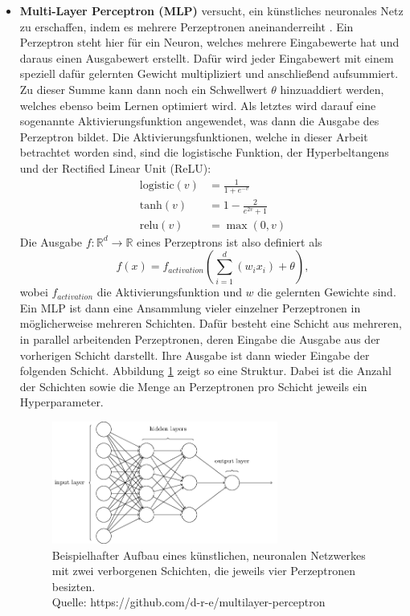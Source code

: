 \begin{itemize}
   \item \textbf{Multi-Layer Perceptron (MLP)} versucht, ein künstliches neuronales Netz zu erschaffen, indem es
    mehrere Perzeptronen aneinanderreiht \cite{mlMLP}. Ein Perzeptron steht hier für ein Neuron, welches mehrere
    Eingabewerte hat und daraus einen Ausgabewert erstellt. Dafür wird jeder Eingabewert mit einem speziell dafür
    gelernten Gewicht multipliziert und anschließend aufsummiert. Zu dieser Summe kann dann noch ein Schwellwert
    $\theta$ hinzuaddiert werden, welches ebenso beim Lernen optimiert wird. Als letztes wird darauf eine sogenannte
    Aktivierungsfunktion angewendet, was dann die Ausgabe des Perzeptron bildet. Die Aktivierungsfunktionen,
    welche in dieser Arbeit betrachtet worden sind, sind die logistische Funktion, der Hyperbeltangens und der
    Rectified Linear Unit (ReLU):
    \begin{align}
        \text{logistic}(v) &= \frac{1}{1+e^{-v}}\\
        \text{tanh}(v)     &= 1-\frac{2}{e^{2v}+1}\\
        \text{relu}(v)     &= \max(0, v)
    \end{align}
    Die Ausgabe $f : \mathbb{R}^d \rightarrow \mathbb{R}$ eines Perzeptrons ist also definiert als
    \begin{equation}
            f(x) = f_{activation}(\sum_{i=1}^d(w_ix_i)+\theta),
    \end{equation}
    wobei $f_{activation}$ die Aktivierungsfunktion und $w$ die gelernten Gewichte sind. Ein MLP ist dann eine
    Ansammlung vieler einzelner Perzeptronen in möglicherweise mehreren Schichten. Dafür besteht eine Schicht
    aus mehreren, in parallel arbeitenden Perzeptronen, deren Eingabe die Ausgabe aus der vorherigen Schicht
    darstellt. Ihre Ausgabe ist dann wieder Eingabe der folgenden Schicht. Abbildung \ref{fig:theory-mlp} zeigt so
    eine Struktur. Dabei ist die Anzahl der Schichten sowie die Menge an Perzeptronen pro Schicht jeweils ein
    Hyperparameter.

    \begin{figure}
        \centering
        \includegraphics[width=0.7\textwidth]{res/theory-mlp}
        \caption{Beispielhafter Aufbau eines künstlichen, neuronalen Netzwerkes mit zwei verborgenen Schichten, die
            jeweils vier Perzeptronen besizten.\\ Quelle: https://github.com/d-r-e/multilayer-perceptron}
        \label{fig:theory-mlp}
    \end{figure}


\end{itemize}
